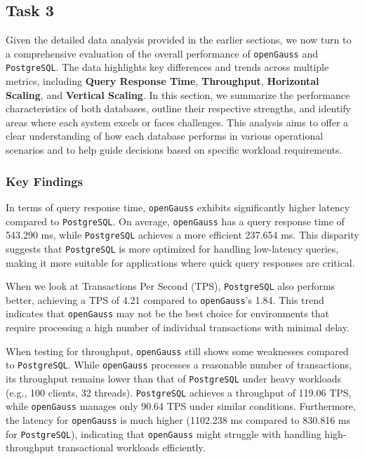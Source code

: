 \documentclass[12pt,a4paper,cs4size]{ctexart}
\begin{document}
\subsection*{Task 3}

Given the detailed data analysis provided in the earlier sections, we now turn to a comprehensive evaluation of the overall performance of \texttt{openGauss} and \texttt{PostgreSQL}. The data highlights key differences and trends across multiple metrics, including \textbf{Query Response Time}, \textbf{Throughput}, \textbf{Horizontal Scaling}, and \textbf{Vertical Scaling}. In this section, we summarize the performance characteristics of both databases, outline their respective strengths, and identify areas where each system excels or faces challenges. This analysis aims to offer a clear understanding of how each database performs in various operational scenarios and to help guide decisions based on specific workload requirements.

\subsubsection*{Key Findings}

In terms of query response time, \texttt{openGauss} exhibits significantly higher latency compared to \texttt{PostgreSQL}. On average, \texttt{openGauss} has a query response time of 543.290 ms, while \texttt{PostgreSQL} achieves a more efficient 237.654 ms. This disparity suggests that \texttt{PostgreSQL} is more optimized for handling low-latency queries, making it more suitable for applications where quick query responses are critical.

When we look at Transactions Per Second (TPS), \texttt{PostgreSQL} also performs better, achieving a TPS of 4.21 compared to \texttt{openGauss}'s 1.84. This trend indicates that \texttt{openGauss} may not be the best choice for environments that require processing a high number of individual transactions with minimal delay.

When testing for throughput, \texttt{openGauss} still shows some weaknesses compared to \texttt{PostgreSQL}. While \texttt{openGauss} processes a reasonable number of transactions, its throughput remains lower than that of \texttt{PostgreSQL} under heavy workloads (e.g., 100 clients, 32 threads). \texttt{PostgreSQL} achieves a throughput of 119.06 TPS, while \texttt{openGauss} manages only 90.64 TPS under similar conditions. Furthermore, the latency for \texttt{openGauss} is much higher (1102.238 ms compared to 830.816 ms for \texttt{PostgreSQL}), indicating that \texttt{openGauss} might struggle with handling high-throughput transactional workloads efficiently.
\end{document}
